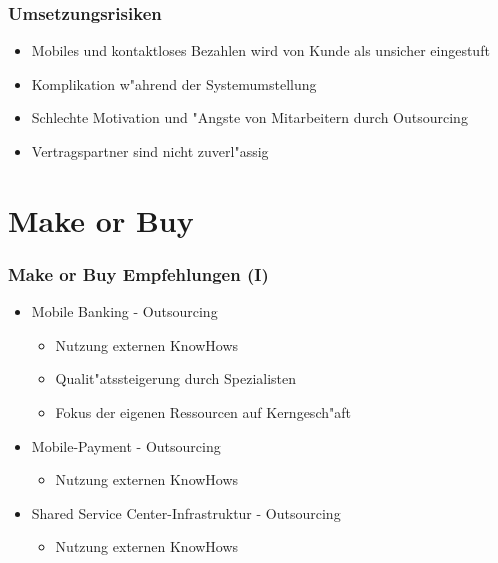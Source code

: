 \documentclass{beamer}
\begin{document}
\begin{frame}
  \frametitle{Umsetzungsrisiken}
  \begin{itemize}

	\item Mobiles und kontaktloses Bezahlen wird von Kunde als unsicher eingestuft \vspace{2mm}
	\item Komplikation w"ahrend der Systemumstellung\vspace{2mm}
	\item Schlechte Motivation und "Angste von Mitarbeitern durch Outsourcing\vspace{2mm}
	\item Vertragspartner sind nicht zuverl"assig

  \end{itemize}
\end{frame}

\section{Make or Buy}
\begin{frame}
  \frametitle{Make or Buy Empfehlungen (I)}
  \begin{itemize}

	\item Mobile Banking - Outsourcing
		\begin{itemize}
			\item Nutzung externen KnowHows
			\item Qualit"atssteigerung durch Spezialisten
			\item Fokus der eigenen Ressourcen auf Kerngesch"aft\vspace{2mm}
		\end{itemize}
	\item Mobile-Payment - Outsourcing
		\begin{itemize}
			\item Nutzung externen KnowHows\vspace{2mm}
		\end{itemize}
	\item Shared Service Center-Infrastruktur - Outsourcing
			\begin{itemize}
			\item Nutzung externen KnowHows\vspace{2mm}
		\end{itemize}

  \end{itemize}
\end{frame}
\end{document}
